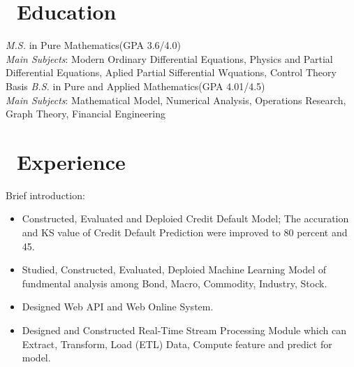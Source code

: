 \documentclass{resume}
\begin{document}



\section{\faGraduationCap\ Education}
\textit{M.S.} in Pure Mathematics(GPA 3.6/4.0) \\
\textit{Main Subjects}: 
Modern Ordinary Differential Equations, Physics and Partial Differential Equations, Aplied Partial Sifferential Wquations, Control Theory Basis
\textit{B.S.} in Pure and Applied Mathematics(GPA 4.01/4.5)\\
\textit{Main Subjects}:
Mathematical Model, Numerical Analysis, Operations Research, Graph Theory, Financial Engineering

\section{\faUsers\ Experience}
\role{Data Scientist}{}
Brief introduction:
\begin{itemize}
  \item Constructed, Evaluated and Deploied Credit Default Model; The accuration
	  and KS value of Credit Default Prediction were improved to 80 percent and 45.
  \item Studied, Constructed, Evaluated, Deploied Machine Learning Model of fundmental analysis among Bond, Macro, Commodity, Industry, Stock.   
  \item Designed Web API and Web Online System.
  \item Designed and Constructed Real-Time Stream Processing Module which can Extract, Transform, Load (ETL) Data,  Compute feature and predict for model.	  
\end{itemize}
\end{document}
